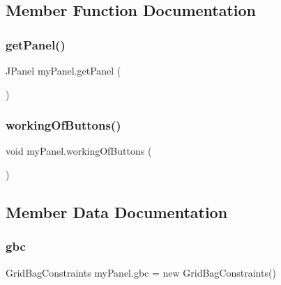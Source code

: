 \subsection{Member Function Documentation}
\hypertarget{classmy_panel_a259592e52478c99ae70c9e962ad17236}{}\label{classmy_panel_a259592e52478c99ae70c9e962ad17236} 
\subsubsection{\texorpdfstring{get\+Panel()}{getPanel()}}
{\footnotesize\ttfamily J\+Panel my\+Panel.\+get\+Panel (\begin{DoxyParamCaption}{ }\end{DoxyParamCaption})}

\hypertarget{classmy_panel_ac67bebd824b15236aa5213673cd49c88}{}\label{classmy_panel_ac67bebd824b15236aa5213673cd49c88} 
\subsubsection{\texorpdfstring{working\+Of\+Buttons()}{workingOfButtons()}}
{\footnotesize\ttfamily void my\+Panel.\+working\+Of\+Buttons (\begin{DoxyParamCaption}{ }\end{DoxyParamCaption})}



\subsection{Member Data Documentation}
\hypertarget{classmy_panel_ac5085bb42695859a6e335cc034eabe1e}{}\label{classmy_panel_ac5085bb42695859a6e335cc034eabe1e} 
\subsubsection{\texorpdfstring{gbc}{gbc}}
{\footnotesize\ttfamily Grid\+Bag\+Constraints my\+Panel.\+gbc = new Grid\+Bag\+Constraints()\hspace{0.3cm}{\ttfamily [private]}}

\hypertarget{classmy_panel_a1c490278eaeddcb1dae9467a00273649}{}\label{classmy_panel_a1c490278eaeddcb1dae9467a00273649} 

